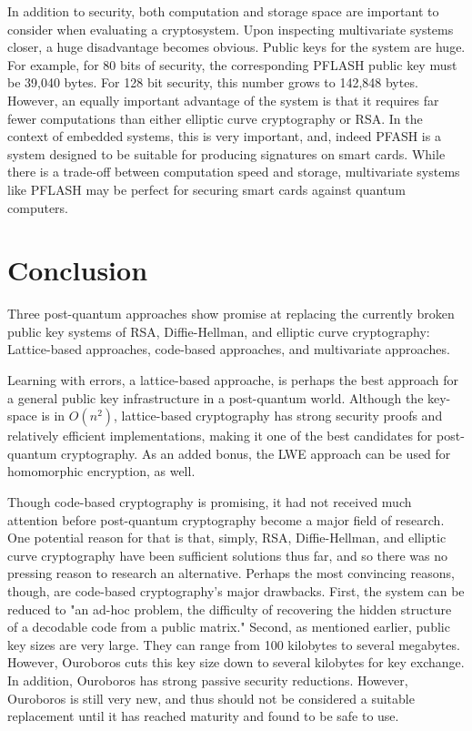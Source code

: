 \documentclass{article}
\begin{document}
In addition to security, both computation and storage space are important to consider when evaluating a cryptosystem. Upon inspecting multivariate systems closer, a huge disadvantage becomes obvious. Public keys for the system are huge. For example, for 80 bits of security, the corresponding PFLASH public key must be 39,040 bytes. For 128 bit security, this number grows to 142,848 bytes.\cite{chen15} However, an equally important advantage of the system is that it requires far fewer computations than either elliptic curve cryptography or RSA. In the context of embedded systems, this is very important,\cite{bernstein09} and, indeed PFASH is a system designed to be suitable for producing signatures on smart cards. While there is a trade-off between computation speed and storage, multivariate systems like PFLASH may be perfect for securing smart cards against quantum computers.

\section{Conclusion}

Three post-quantum approaches show promise at replacing the currently broken public key systems of RSA, Diffie-Hellman, and elliptic curve cryptography: Lattice-based approaches, code-based approaches, and multivariate approaches.

Learning with errors, a lattice-based approache, is perhaps the best approach for a general public key infrastructure in a post-quantum world. Although the key-space is in $ O(n^2) $, lattice-based cryptography has strong security proofs and relatively efficient implementations, making it one of the best candidates for post-quantum cryptography.\cite{bernstein09} As an added bonus, the LWE approach can be used for homomorphic encryption, as well.\cite{koc15}

Though code-based cryptography is promising, it had not received much attention before post-quantum cryptography become a major field of research. One potential reason for that is that, simply, RSA, Diffie-Hellman, and elliptic curve cryptography have been sufficient solutions thus far, and so there was no pressing reason to research an alternative.\cite{bernstein09} Perhaps the most convincing reasons, though, are code-based cryptography's major drawbacks. First, the system can be reduced to "an ad-hoc problem, the difficulty of recovering the hidden structure of a decodable code from a public matrix." Second, as mentioned earlier, public key sizes are very large.\cite{deneuville17} They can range from 100 kilobytes to several megabytes.\cite{bernstein09} However, Ouroboros cuts this key size down to several kilobytes for key exchange. In addition, Ouroboros has strong passive security reductions. However, Ouroboros is still very new, and thus should not be considered a suitable replacement until it has reached maturity and found to be safe to use.
\end{document}
